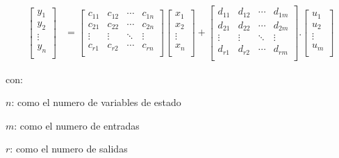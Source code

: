 \begin{align}
\begin{bmatrix}
                    y_{1}\\
                    y_{2}\\
                    \vdots\\
                    y_{n}\\
                    \end{bmatrix}&=
                    \begin{bmatrix}
                    c_{11} & c_{12} & \cdots & c_{1n}\\
                    c_{21} & c_{22} & \cdots & c_{2n}\\
                    \vdots & \vdots & \ddots & \vdots\\
                    c_{r1} & c_{r2} & \cdots & c_{rn}\\
                    \end{bmatrix}
                    \begin{bmatrix}
                    x_{1}\\
                    x_{2}\\
                    \vdots\\
                    x_{n}\\
                    \end{bmatrix}+
                    \begin{bmatrix}
                    d_{11} & d_{12} & \cdots & d_{1m}\\
                    d_{21} & d_{22} & \cdots & d_{2m}\\
                    \vdots & \vdots & \ddots & \vdots\\
                    d_{r1} & d_{r2} & \cdots & d_{rm}\\
                    \end{bmatrix}.
                    \begin{bmatrix}
                    u_{1}\\
                    u_{2}\\
                    \vdots\\
                    u_{m}\\
                    \end{bmatrix}
            \end{align}
            \vspace{20pt}

            \begin{spacing}{1.5}
				\noindent con: 
				
				$n$: como el numero de variables de estado
				
				$m$: como el numero de entradas
				
				$r$: como el numero de salidas
				
            \end{spacing}

